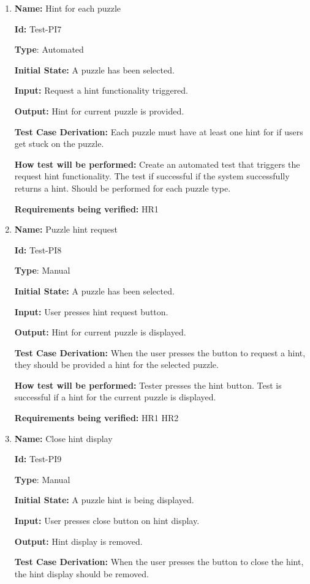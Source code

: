 \documentclass[12pt, titlepage]{article}
\begin{document}
\begin{enumerate}
\item{\textbf{Name:} Hint for each puzzle}

\textbf{Id:} Test-PI7

\textbf{Type}: Automated

\textbf{Initial State:} A puzzle has been selected.

\textbf{Input:} Request a hint functionality triggered.

\textbf{Output:} Hint for current puzzle is provided.

\textbf{Test Case Derivation:}
Each puzzle must have at least one hint for if users get stuck on the puzzle.

\textbf{How test will be performed:}
Create an automated test that triggers the request hint functionality. The test if successful if the system successfully returns a hint. Should be performed for each puzzle type.

\textbf{Requirements being verified: } HR1

\item{\textbf{Name:} Puzzle hint request}

\textbf{Id:} Test-PI8

\textbf{Type}: Manual

\textbf{Initial State:} A puzzle has been selected.

\textbf{Input:} User presses hint request button.

\textbf{Output:} Hint for current puzzle is displayed.

\textbf{Test Case Derivation:}
When the user presses the button to request a hint, they should be provided a hint for the selected puzzle.

\textbf{How test will be performed:}
Tester presses the hint button. Test is successful if a hint for the current puzzle is displayed.

\textbf{Requirements being verified: } HR1 HR2

\item{\textbf{Name:} Close hint display}

\textbf{Id:} Test-PI9

\textbf{Type}: Manual

\textbf{Initial State:} A puzzle hint is being displayed.

\textbf{Input:} User presses close button on hint display.

\textbf{Output:} Hint display is removed.

\textbf{Test Case Derivation:}
When the user presses the button to close the hint, the hint display should be removed.


\end{enumerate}
\end{document}
